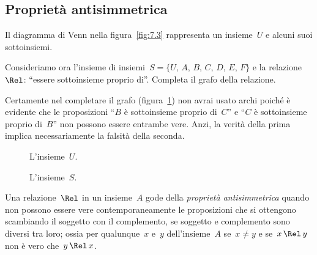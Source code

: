 \ovalbox{\risolvi \ref{ese:7.20}}

\subsection{Proprietà antisimmetrica}

\begin{exrig}
 \begin{esempio}

Il diagramma di Venn nella figura~\ref{fig:7.3} rappresenta un insieme~$U$ e alcuni suoi sottoinsiemi.

Consideriamo ora l'insieme di insiemi~$S = \{U\text{,~}A\text{,~}B\text{,~}C\text{,~}D\text{,~}E\text{,~}F\}$ e la relazione~$\Rel$: ``essere sottoinsieme proprio di''.
Completa il grafo della relazione.

Certamente nel completare il grafo (figura~\ref{fig:7.4}) non avrai usato archi poiché è evidente che le proposizioni ``$B$ è sottoinsieme proprio di~$C$'' e ``$C$
è sottoinsieme proprio di~$B$'' non possono essere entrambe vere. Anzi, la verità della prima implica necessariamente la falsità della seconda.
 \end{esempio}
\end{exrig}

\begin{figure}[hb]
\begin{minipage}[b]{.45\textwidth}
 \centering
 
 \caption{L'insieme~$U$.}\label{fig:7.3}
\end{minipage}\hfil
\begin{minipage}[b]{.45\textwidth}
 \centering
 
 \caption{L'insieme~$S$.}\label{fig:7.4}
\end{minipage}
\end{figure}

\begin{definizione}
Una relazione~$\Rel$ in un insieme~$A$ gode della \emph{proprietà antisimmetrica} quando non possono essere vere
contemporaneamente le proposizioni che si ottengono scambiando il soggetto con il complemento, se soggetto e complemento sono diversi
tra loro; ossia per qualunque~$x$ e~$y$ dell'insieme~$A$ se~$x \neq y$ e se~$x \,\Rel\, y$ non è vero che~$y \,\Rel\, x$.
\end{definizione}

\ovalbox{\risolvi \ref{ese:7.21}}

